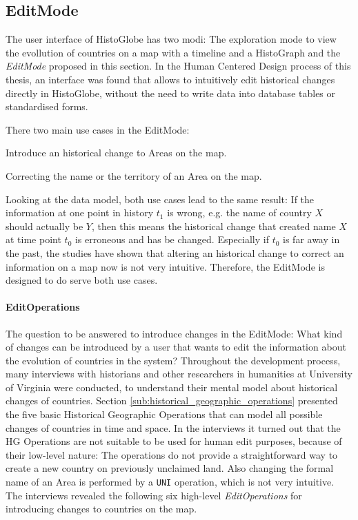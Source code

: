 
\subsection{EditMode} %
\label{sub:editmode}

The user interface of HistoGlobe has two modi: The exploration mode to view the evollution of countries on a map with a timeline and a HistoGraph and the \emph{EditMode} proposed in this section. In the Human Centered Design process of this thesis, an interface was found that allows to intuitively edit historical changes directly in HistoGlobe, without the need to write data into database tables or standardised forms.

There two main use cases in the EditMode:
\begin{compactenum}
  \item Introduce an historical change to Areas on the map.
  \item Correcting the name or the territory of an Area on the map.
\end{compactenum}

Looking at the data model, both use cases lead to the same result: If the information at one point in history $t_1$ is wrong, e.g. the name of country $X$ should actually be $Y$, then this means the historical change that created name $X$ at time point $t_0$ is erroneous and has be changed. Especially if $t_0$ is far away in the past, the studies have shown that altering an historical change to correct an information on a map now is not very intuitive. Therefore, the EditMode is designed to do serve both use cases.

\paragraph{EditOperations} %
\label{par:editoperations}

The question to be answered to introduce changes in the EditMode: What kind of changes can be introduced by a user that wants to edit the information about the evolution of countries in the system? Throughout the development process, many interviews with historians and other researchers in humanities at University of Virginia were conducted, to understand their mental model about historical changes of countries. Section \ref{sub:historical_geographic_operations} presented the five basic Historical Geographic Operations that can model all possible changes of countries in time and space. In the interviews it turned out that the HG Operations are not suitable to be used for human edit purposes, because of their low-level nature: The operations do not provide a straightforward way to create a new country on previously unclaimed land. Also changing the formal name of an Area is performed by a \texttt{UNI} operation, which is not very intuitive. The interviews revealed the following six high-level \emph{EditOperations} for introducing changes to countries on the map.

